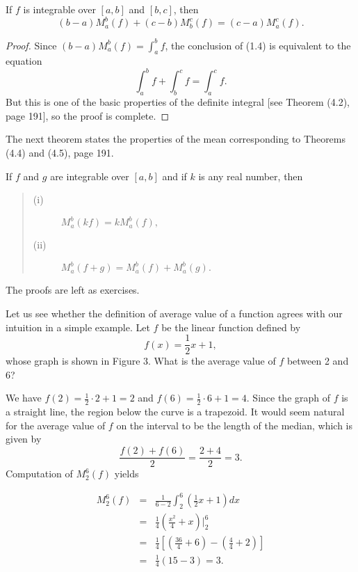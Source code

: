 \begin{theorem} %
If $f$ is integrable over $[a, b]$ and $[b, c]$, then
$$
(b - a)M_a^{b}(f) + (c - b)M_b^{c}(f) = (c - a)M_a^{c}(f).
$$
\end{theorem}


\begin{proof}
Since $(b - a)M_a^b(f) = \int_a^b f$, the conclusion of (1.4) is equivalent to the equation
$$
\int_a^b f + \int_b^c f = \int_a^c f .
$$
But this is one of the basic properties of the definite integral [see Theorem (4.2), page 191], so the proof is complete.
\end{proof}

The next theorem states the properties of the mean corresponding to Theorems (4.4) and (4.5), page 191.

\begin{theorem} %
If $f$ and $g$ are integrable over $[a, b]$ and if $k$ is any real number, then
 
\begin{quote}
\begin{description}
\item[(i)] $M_a^b(kf)= kM_a^b(f),$ 
\item[(ii)] $M_a^b(f + g) = M_a^b(f ) + M_a^b(g).$

\end{description}
\end{quote}
 
The proofs are left as exercises.
\end{theorem}
\begin{example}
Let us see whether the definition of average value of a function agrees with our intuition in a simple example. Let $f$ be the linear function defined by
$$
f(x) = \frac{1}{2} x + 1, 
$$
\noindent whose graph is shown in Figure 3. What is the average value of $f$ between
2 and 6?


We have $f(2) = \frac{1}{2} \cdot 2 + 1 = 2$ and $f(6) = \frac{1}{2} \cdot 6 + 1 = 4$. Since the graph of $f$ is a straight line, the region below the curve is a trapezoid. It would seem natural for the average value of $f$ on the interval to be the length of the median, which is given by
$$
\frac{f(2) + f(6)}{2} = \frac{2 + 4}{2} = 3. 
$$
\noindent Computation of $M_2^6(f)$ yields 

\begin{eqnarray*}
M_2^6(f) &=& \frac{1}{6 - 2} \int_2^6 (\frac{1}{2}x + 1)dx \\
&=& \frac{1}{4} (\frac{x^2}{4} + x)\Big|_2^6 \\
&=& \frac{1}{4} [( \frac{36}{4} + 6) - (\frac{4}{4} + 2)] \\
&=& \frac{1}{4} (15 - 3) = 3.
\end{eqnarray*}
\end{example}

